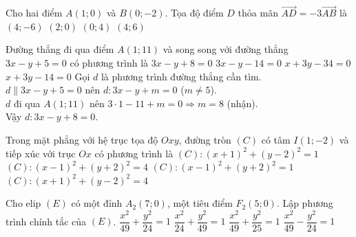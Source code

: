 \begin{ex}%
Cho hai điểm $ A(1;0) $ và $ B(0;-2) $. Tọa độ điểm $ D $ thỏa mãn $ \vec{AD}=-3\vec{AB} $ là
\choice
{ $(4;-6) $}
{$ (2;0) $}
{$ (0;4)  $}
{\True$ (4;6)  $}
\end{ex}

\begin{ex}%
Đường thẳng đi qua điểm $A(1; 11)$ và song song với đường thẳng $3x - y + 5 = 0$ có phương trình là
\choice
{\True $3x - y + 8 = 0$}
{$3x - y - 14 = 0$}
{$x + 3y - 34 = 0$}
{$x + 3y - 14 = 0$}
\loigiai
{
Gọi $d$ là phương trình đường thẳng cần tìm.\\
$d\parallel 3x-y+5=0$ nên $d\colon 3x-y+m=0$ ($m\ne 5$).\\
$d$ đi qua $A(1;11)$ nên $3\cdot 1-11+m=0\Rightarrow m=8$ (nhận).\\
Vậy $d\colon 3x-y+8=0$.
}
\end{ex}

\begin{ex}%
Trong mặt phẳng với hệ trục tọa độ $Oxy$, đường tròn $(C)$ có tâm $I(1;-2)$ và tiếp xúc với trục $Ox$ có phương trình là
\choice
{$(C): (x+1)^2+(y-2)^2=1$}
{\True $(C): (x-1)^2+(y+2)^2=4$}
{$(C): (x-1)^2+(y+2)^2=1$}
{$(C): (x+1)^2+(y-2)^2=4$}
\end{ex}

\begin{ex}%
Cho elip $(E)$ có một đỉnh $A_2(7;0)$, một tiêu điểm $F_2(5;0)$.  Lập phương trình chính tắc của $(E)$.
\choice
{\True $\dfrac{x^2}{49}+\dfrac{y^2}{24}=1$}
{$\dfrac{x^2}{24}+\dfrac{y^2}{49}=1$}
{$\dfrac{x^2}{49}+\dfrac{y^2}{25}=1$}
{$\dfrac{x^2}{49}-\dfrac{y^2}{24}=1$}
\end{ex}

